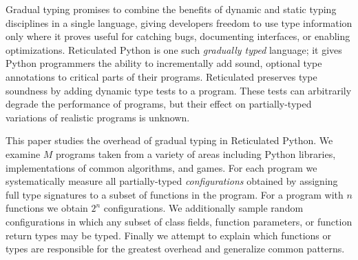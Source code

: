 Gradual typing promises to combine the benefits of dynamic and static typing
disciplines in a single language, giving developers freedom to use type information
only where it proves useful for catching bugs, documenting interfaces, or enabling optimizations.
Reticulated Python is one such \emph{gradually typed} language; it gives Python programmers
the ability to incrementally add sound, optional type annotations to critical parts of their programs.
Reticulated preserves type soundness by adding dynamic type tests to a program.
These tests can arbitrarily degrade the performance of programs, but their effect on
partially-typed variations of realistic programs is unknown.

This paper studies the overhead of gradual typing in Reticulated Python.
We examine $M$ programs taken from a variety of areas including Python libraries, implementations of common algorithms, and games.
For each program we systematically measure all partially-typed \emph{configurations} obtained by assigning full type signatures to a subset of functions in the program.
For a program with $n$  functions we obtain  $2^n$ configurations.
We additionally sample random configurations in which any subset of class fields, function parameters, or function return types may be typed.
Finally we attempt to explain which functions or types are responsible for the greatest overhead and generalize common patterns.






